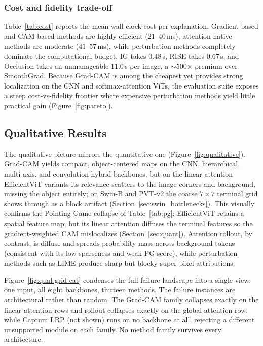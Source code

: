 \documentclass[final,5p,times,twocolumn]{elsarticle}
\begin{document}
\subsubsection{Cost and fidelity trade-off}
Table~\ref{tab:cost} reports the mean wall-clock cost per explanation. Gradient-based and CAM-based methods are highly efficient ($21$--$40$\,ms), attention-native methods are moderate ($41$--$57$\,ms), while perturbation methods completely dominate the computational budget. IG takes $0.48$\,s, RISE takes $0.67$\,s, and Occlusion takes an unmanageable $11.0$\,s per image, a $\sim$500$\times$ premium over SmoothGrad. Because Grad-CAM is among the cheapest yet provides strong localization on the CNN and softmax-attention ViTs, the evaluation suite exposes a steep cost-vs-fidelity frontier where expensive perturbation methods yield little practical gain (Figure~\ref{fig:pareto}).



\subsection{Qualitative Results}
\label{sec:qual}

The qualitative picture mirrors the quantitative one (Figure~\ref{fig:qualitative}).
Grad-CAM yields compact, object-centered maps on the CNN, hierarchical, multi-axis,
and convolution-hybrid backbones, but on the linear-attention EfficientViT variants
its relevance scatters to the image corners and background, missing the object
entirely; on Swin-B and PVT-v2 the coarse $7 \times 7$ terminal grid shows through
as a block artifact (Section~\ref{sec:swin_bottlenecks}). This visually confirms the
Pointing Game collapse of Table~\ref{tab:pg}: EfficientViT retains a spatial feature
map, but its linear attention diffuses the terminal features so the gradient-weighted
CAM mislocalizes (Section~\ref{sec:quant}).
Attention rollout, by contrast, is diffuse and spreads probability mass across
background tokens (consistent with its low sparseness and weak PG score),
while perturbation methods such as LIME produce sharp but blocky super-pixel
attributions.

Figure~\ref{fig:qual-grid-cat} condenses the full failure landscape into a single
view: one input, all eight backbones, thirteen methods. The failure instances are
architectural rather than random. The Grad-CAM family collapses exactly on the
linear-attention rows and rollout collapses exactly on the global-attention row,
while Captum LRP (not shown) runs on no backbone at all, rejecting a different
unsupported module on each family. No method family survives every architecture.
\end{document}
